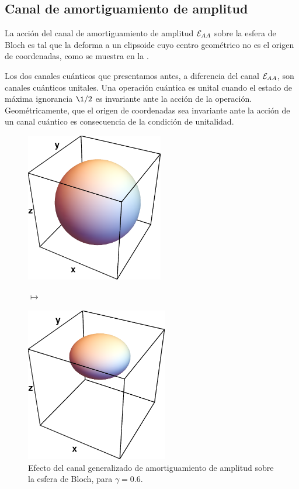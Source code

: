 \subsection{Canal de amortiguamiento de amplitud} %
La acción del canal de amortiguamiento de amplitud $\mathcal{E}_{AA}$
sobre la esfera de Bloch es tal que la deforma a un elipsoide
cuyo centro geométrico no es el origen de coordenadas, 
como se muestra en la . 

Los dos canales cuánticos que presentamos antes, a diferencia 
del canal $\mathcal{E}_{AA}$, son canales cuánticos unitales. Una operación 
cuántica es unital cuando el estado de máxima ignorancia $\1/2$
es invariante ante la acción de la operación.
Geométricamente, que el origen de coordenadas 
sea invariante ante la acción de un canal cuántico es consecuencia 
de la condición de unitalidad.
\begin{figure}
    \centering
    \begin{minipage}{.4\textwidth}
        \centering
        \includegraphics[width=6cm]{images/bloch-ball}
    \end{minipage}
    $\longmapsto$
    \begin{minipage}{0.4\textwidth}
        \centering
        \includegraphics[width=6.2cm]{images/amp-damping}
    \end{minipage}
    \caption{Efecto del canal generalizado de amortiguamiento de 
        amplitud sobre la esfera de Bloch, 
        para $\gamma=0.6$.}
    \label{fig:amp-damp}
\end{figure}

